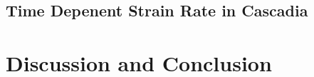 \documentclass[10pt,a4paper]{article}
\begin{document}
\subsection{Time Depenent Strain Rate in Cascadia}\label{sec:ApplicationsCascadia}

\section{Discussion and Conclusion}\label{sec:Discussion}



  
 
\end{document}
